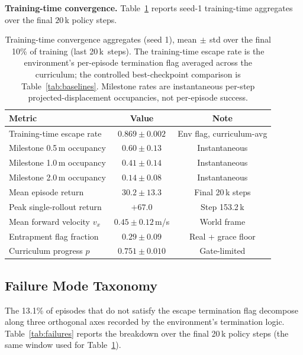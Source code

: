 \documentclass[conference]{IEEEtran}
\begin{document}
\medskip\noindent\textbf{Training-time convergence.}
Table~\ref{tab:results} reports seed-1 training-time aggregates over the final
$20$\,k policy steps.

\begin{table}[!htbp]
  \centering
  \caption{Training-time convergence aggregates (seed 1), mean$\,\pm\,$std over
    the final 10\% of training (last 20\,k~steps). The training-time escape rate
    is the environment's per-episode termination flag averaged across the
    curriculum; the controlled best-checkpoint comparison is
    Table~\ref{tab:baselines}. Milestone rates are instantaneous per-step
    projected-displacement occupancies, not per-episode success.}
  \label{tab:results}
  \renewcommand{\arraystretch}{1.2}
  \begin{tabular}{@{}lcc@{}}
    \toprule
    \textbf{Metric} & \textbf{Value} & \textbf{Note} \\
    \midrule
    Training-time escape rate     & $0.869 \pm 0.002$ & Env flag, curriculum-avg \\
    Milestone 0.5\,m occupancy    & $0.60 \pm 0.13$   & Instantaneous \\
    Milestone 1.0\,m occupancy    & $0.41 \pm 0.14$   & Instantaneous \\
    Milestone 2.0\,m occupancy    & $0.14 \pm 0.08$   & Instantaneous \\
    Mean episode return           & $30.2 \pm 13.3$   & Final 20\,k steps \\
    Peak single-rollout return    & $+67.0$           & Step 153.2\,k \\
    Mean forward velocity $v_x$   & $0.45 \pm 0.12$\,m/s & World frame \\
    Entrapment flag fraction      & $0.29 \pm 0.09$   & Real + grace floor \\
    Curriculum progress $p$       & $0.751 \pm 0.010$ & Gate-limited \\
    \bottomrule
  \end{tabular}
\end{table}

\subsection{Failure Mode Taxonomy}
\label{sec:failure_modes}
\label{sec:failures}

The 13.1\% of episodes that do not satisfy the escape termination flag
decompose along three orthogonal axes recorded by the environment's
termination logic. Table~\ref{tab:failures} reports the breakdown over the
final 20\,k policy steps (the same window used for Table~\ref{tab:results}).
\end{document}
